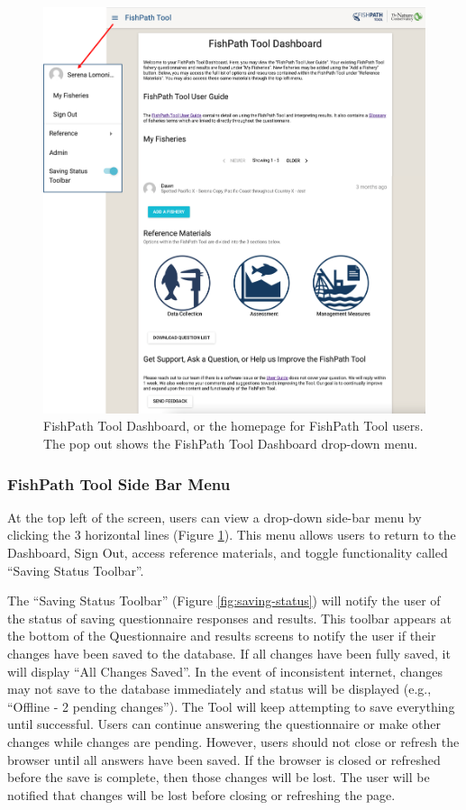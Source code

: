 \documentclass[
  11pt,
]{book}
\begin{document}
\begin{figure}

{\centering \includegraphics[width=0.95\linewidth]{images/user-dashboard} 

}

\caption{FishPath Tool Dashboard, or the homepage for FishPath Tool users. The pop out shows the FishPath Tool Dashboard drop-down menu.}\label{fig:dashboard}
\end{figure}

\hypertarget{fishpath-tool-side-bar-menu}{%
\subsubsection{FishPath Tool Side Bar Menu}\label{fishpath-tool-side-bar-menu}}

At the top left of the screen, users can view a drop-down side-bar menu by clicking the 3 horizontal lines (Figure \ref{fig:dashboard}). This menu allows users to return to the Dashboard, Sign Out, access reference materials, and toggle functionality called ``Saving Status Toolbar''.

The ``Saving Status Toolbar'' (Figure \ref{fig:saving-status}) will notify the user of the status of saving questionnaire responses and results. This toolbar appears at the bottom of the Questionnaire and results screens to notify the user if their changes have been saved to the database. If all changes have been fully saved, it will display ``All Changes Saved''. In the event of inconsistent internet, changes may not save to the database immediately and status will be displayed (e.g., ``Offline - 2 pending changes''). The Tool will keep attempting to save everything until successful. Users can continue answering the questionnaire or make other changes while changes are pending. However, users should not close or refresh the browser until all answers have been saved. If the browser is closed or refreshed before the save is complete, then those changes will be lost. The user will be notified that changes will be lost before closing or refreshing the page.
\end{document}
